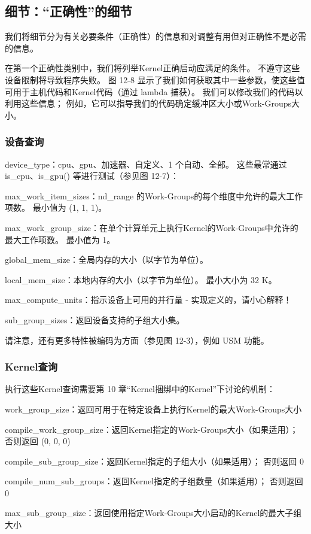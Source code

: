 \subsection{细节：“正确性”的细节}
我们将细节分为有关必要条件（正确性）的信息和对调整有用但对正确性不是必需的信息。

在第一个正确性类别中，我们将列举Kernel正确启动应满足的条件。 不遵守这些设备限制将导致程序失败。 
图 12-8 显示了我们如何获取其中一些参数，使这些值可用于主机代码和Kernel代码（通过 lambda 捕获）。 
我们可以修改我们的代码以利用这些信息； 例如，它可以指导我们的代码确定缓冲区大小或Work-Groups大小。

\subsubsection{设备查询}
device\_type：cpu、gpu、加速器、自定义、1 个自动、全部。 
这些最常通过 is\_cpu、is\_gpu() 等进行测试（参见图 12-7）：

max\_work\_item\_sizes：nd\_range 的Work-Groups的每个维度中允许的最大工作项数。 最小值为 (1, 1, 1)。

max\_work\_group\_size：在单个计算单元上执行Kernel的Work-Groups中允许的最大工作项数。 最小值为 1。

global\_mem\_size：全局内存的大小（以字节为单位）。

local\_mem\_size：本地内存的大小（以字节为单位）。 最小大小为 32 K。

max\_compute\_units：指示设备上可用的并行量 - 实现定义的，请小心解释！

sub\_group\_sizes：返回设备支持的子组大小集。

请注意，还有更多特性被编码为方面（参见图 12-3），例如 USM 功能。

\subsubsection{Kernel查询}
执行这些Kernel查询需要第 10 章“Kernel捆绑中的Kernel”下讨论的机制：

work\_group\_size：返回可用于在特定设备上执行Kernel的最大Work-Groups大小

compile\_work\_group\_size：返回Kernel指定的Work-Groups大小（如果适用）； 否则返回 (0, 0, 0)

compile\_sub\_group\_size：返回Kernel指定的子组大小（如果适用）； 否则返回 0

compile\_num\_sub\_groups：返回Kernel指定的子组数量（如果适用）； 否则返回 0

max\_sub\_group\_size：返回使用指定Work-Groups大小启动的Kernel的最大子组大小

